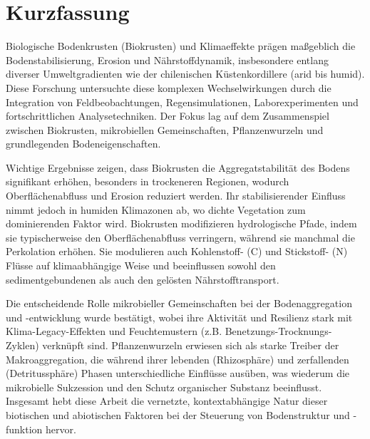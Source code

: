 \chapter*{Kurzfassung}

\begin{justify}
Biologische Bodenkrusten (Biokrusten) und Klimaeffekte prägen maßgeblich die Bodenstabilisierung, Erosion und Nährstoffdynamik, insbesondere entlang diverser Umweltgradienten wie der chilenischen Küstenkordillere (arid bis humid). Diese Forschung untersuchte diese komplexen Wechselwirkungen durch die Integration von Feldbeobachtungen, Regensimulationen, Laborexperimenten und fortschrittlichen Analysetechniken. Der Fokus lag auf dem Zusammenspiel zwischen Biokrusten, mikrobiellen Gemeinschaften, Pflanzenwurzeln und grundlegenden Bodeneigenschaften.

Wichtige Ergebnisse zeigen, dass Biokrusten die Aggregatstabilität des Bodens signifikant erhöhen, besonders in trockeneren Regionen, wodurch Oberflächenabfluss und Erosion reduziert werden. Ihr stabilisierender Einfluss nimmt jedoch in humiden Klimazonen ab, wo dichte Vegetation zum dominierenden Faktor wird. Biokrusten modifizieren hydrologische Pfade, indem sie typischerweise den Oberflächenabfluss verringern, während sie manchmal die Perkolation erhöhen. Sie modulieren auch Kohlenstoff- (C) und Stickstoff- (N) Flüsse auf klimaabhängige Weise und beeinflussen sowohl den sedimentgebundenen als auch den gelösten Nährstofftransport.

Die entscheidende Rolle mikrobieller Gemeinschaften bei der Bodenaggregation und -entwicklung wurde bestätigt, wobei ihre Aktivität und Resilienz stark mit Klima-Legacy-Effekten und Feuchtemustern (z.B. Benetzungs-Trocknungs-Zyklen) verknüpft sind. Pflanzenwurzeln erwiesen sich als starke Treiber der Makroaggregation, die während ihrer lebenden (Rhizosphäre) und zerfallenden (Detritussphäre) Phasen unterschiedliche Einflüsse ausüben, was wiederum die mikrobielle Sukzession und den Schutz organischer Substanz beeinflusst. Insgesamt hebt diese Arbeit die vernetzte, kontextabhängige Natur dieser biotischen und abiotischen Faktoren bei der Steuerung von Bodenstruktur und -funktion hervor.
\end{justify}
